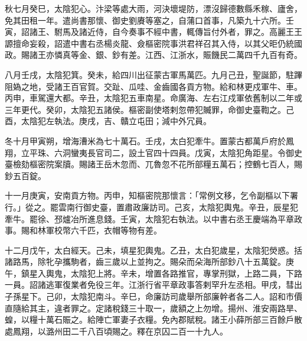 \begin{pinyinscope}
 秋七月癸巳，太陰犯心。汴梁等處大雨，河決壞堤防，漂沒歸德數縣禾稼、廬舍，免其田租一年。遣尚書那懷、御史劉賡等塞之，自蒲口首事，凡築九十六所。壬寅，詔諸王、駙馬及諸近侍，自今奏事不經中書，輒傳旨付外者，罪之。高麗王王謜擅命妄殺，詔遣中書右丞楊炎龍、僉樞密院事洪君祥召其入侍，以其父昛仍統國政。賜諸王亦憐真等金、銀、鈔有差。江西、江浙水，賑饑民二萬四千九百有奇。



 八月壬戌，太陰犯箕。癸未，給四川出征蒙古軍馬萬匹。九月己丑，聖誕節，駐蹕阻媯之地，受諸王百官賀。交趾、瓜哇、金齒國各貢方物。給和林更戍軍牛、車。丙申，車駕還大都。辛丑，太陰犯五車南星。命廣海、左右江戍軍依舊制以二年或三年更代。癸卯，太陰犯五諸侯。樞密副使塔剌忽帶犯贓罪，命御史臺鞫之。己酉，太陰犯左執法。庚戌，吉、贛立屯田；減中外冗員。



 冬十月甲寅朔，增海漕米為七十萬石。壬戌，太白犯牽牛。置蒙古都萬戶府於鳳翔，立平珠、六洞蠻夷長官司二，設土官四十四員。戊寅，太陰犯角距星。令御史臺檢劾樞密院案牘。賜諸王岳木忽而、兀魯忽不花所部糧五萬石；控鶴七百人，賜鈔五百錠。



 十一月庚寅，安南貢方物。丙申，知樞密院那懷言：「常例文移，乞令副樞以下署行。」從之。罷雲南行御史臺，置肅政廉訪司。己亥，太陰犯輿鬼。辛丑，辰星犯牽牛。罷徐、邳爐冶所進息錢。壬寅，太陰犯右執法。以中書右丞王慶端為平章政事。賜和林軍校幣六千匹，衣帽等物有差。



 十二月戊午，太白經天。己未，填星犯輿鬼。乙丑，太白犯歲星，太陰犯熒惑。括諸路馬，除牝孕攜駒者，齒三歲以上並拘之。賜朵而朵海所部鈔八十五萬錠。庚午，鎮星入輿鬼，太陰犯上將。辛未，增置各路推官，專掌刑獄，上路二員，下路一員。詔諸逃軍復業者免役三年。江浙行省平章政事答剌罕升左丞相。甲戌，彗出子孫星下。己卯，太陰犯南斗。辛巳，命廉訪司歲舉所部廉幹者各二人。詔和市價直隨給其主，違者罪之。定諸稅錢三十取一，歲額之上勿增。揚州、淮安兩路旱、蝗，以糧十萬石賑之。給陣亡軍妻子衣糧。免內郡賦稅。諸王小薛所部三百餘戶散處鳳翔，以潞州田二千八百頃賜之。釋在京囚二百一十九人。



\end{pinyinscope}